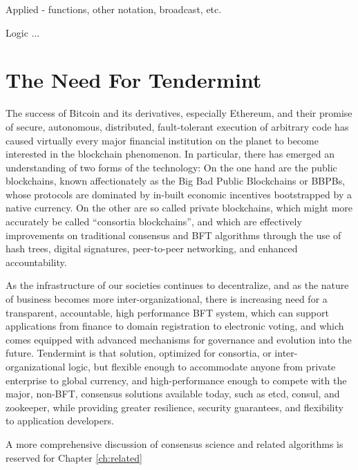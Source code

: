 Applied - functions, other notation, broadcast, etc.

Logic ...


\section{The Need For Tendermint}

The success of Bitcoin and its derivatives, especially Ethereum, and their promise of secure, autonomous, distributed, fault-tolerant execution of arbitrary code has caused virtually every major financial institution on the planet to become interested in the blockchain phenomenon. 
In particular, there has emerged an understanding of two forms of the technology:
On the one hand are the public blockchains, known affectionately as the Big Bad Public Blockchains or BBPBs, 
whose protocols are dominated by in-built economic incentives bootstrapped by a native currency.
On the other are so called private blockchains, which might more accurately be called ``consortia blockchains'',
and which are effectively improvements on traditional consensus and BFT algorithms through the use of hash trees, digital signatures, 
peer-to-peer networking, and enhanced accountability.

As the infrastructure of our societies continues to decentralize, and as the nature of business becomes more inter-organizational,
there is increasing need for a transparent, accountable, high performance BFT system, which can support applications from finance to domain registration to electronic voting,
and which comes equipped with advanced mechanisms for governance and evolution into the future.
Tendermint is that solution, optimized for consortia, or inter-organizational logic, but flexible enough to accommodate anyone from private enterprise to global currency,
and high-performance enough to compete with the major, non-BFT, consensus solutions available today, such as etcd, consul, and zookeeper, while providing greater resilience, security guarantees, and flexibility to application developers.

A more comprehensive discussion of consensus science and related algorithms is reserved for Chapter \ref{ch:related}

